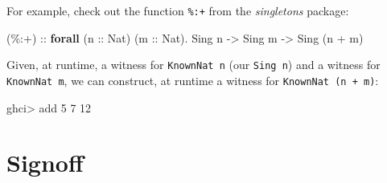 \documentclass[]{article}
\newenvironment{Shaded}{}{}
\newcommand{\CommentTok}[1]{\textcolor[rgb]{0.38,0.63,0.69}{\textit{#1}}}
\newcommand{\DataTypeTok}[1]{\textcolor[rgb]{0.56,0.13,0.00}{#1}}
\newcommand{\DecValTok}[1]{\textcolor[rgb]{0.25,0.63,0.44}{#1}}
\newcommand{\KeywordTok}[1]{\textcolor[rgb]{0.00,0.44,0.13}{\textbf{#1}}}
\newcommand{\NormalTok}[1]{#1}
\newcommand{\OperatorTok}[1]{\textcolor[rgb]{0.40,0.40,0.40}{#1}}
\newcommand{\OtherTok}[1]{\textcolor[rgb]{0.00,0.44,0.13}{#1}}
\begin{document}
For example, check out the function \texttt{\%:+} from the \emph{singletons}
package:

\begin{Shaded}
\begin{Highlighting}[]
\OtherTok{(\%:+) ::} \KeywordTok{forall}\NormalTok{ (}\OtherTok{n ::} \DataTypeTok{Nat}\NormalTok{) (}\OtherTok{m ::} \DataTypeTok{Nat}\NormalTok{)}\OperatorTok{.} \DataTypeTok{Sing}\NormalTok{ n }\OtherTok{{-}\textgreater{}} \DataTypeTok{Sing}\NormalTok{ m }\OtherTok{{-}\textgreater{}} \DataTypeTok{Sing}\NormalTok{ (n }\OperatorTok{+}\NormalTok{ m)}
\end{Highlighting}
\end{Shaded}

Given, at runtime, a witness for \texttt{KnownNat\ n} (our \texttt{Sing\ n}) and
a witness for \texttt{KnownNat\ m}, we can construct, at runtime a witness for
\texttt{KnownNat\ (n\ +\ m)}:

\begin{Shaded}
\end{Shaded}

\begin{Shaded}
\begin{Highlighting}[]
\NormalTok{ghci}\OperatorTok{\textgreater{}}\NormalTok{ add }\DecValTok{5} \DecValTok{7}
\DecValTok{12}
\end{Highlighting}
\end{Shaded}

\section{Signoff}\label{signoff}
\end{document}
